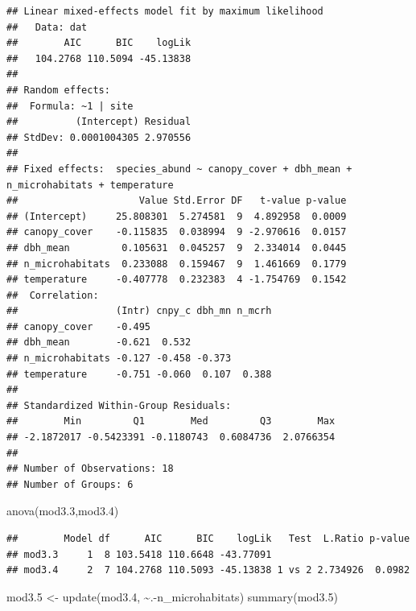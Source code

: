 \documentclass[
]{article}
\newenvironment{Shaded}{\begin{snugshade}}{\end{snugshade}}
\newcommand{\FloatTok}[1]{\textcolor[rgb]{0.00,0.00,0.81}{#1}}
\newcommand{\FunctionTok}[1]{\textcolor[rgb]{0.00,0.00,0.00}{#1}}
\newcommand{\NormalTok}[1]{#1}
\newcommand{\OtherTok}[1]{\textcolor[rgb]{0.56,0.35,0.01}{#1}}
\newcommand{\SpecialCharTok}[1]{\textcolor[rgb]{0.00,0.00,0.00}{#1}}
\begin{document}
\begin{verbatim}
## Linear mixed-effects model fit by maximum likelihood
##   Data: dat 
##        AIC      BIC    logLik
##   104.2768 110.5094 -45.13838
## 
## Random effects:
##  Formula: ~1 | site
##          (Intercept) Residual
## StdDev: 0.0001004305 2.970556
## 
## Fixed effects:  species_abund ~ canopy_cover + dbh_mean + n_microhabitats + temperature 
##                     Value Std.Error DF   t-value p-value
## (Intercept)     25.808301  5.274581  9  4.892958  0.0009
## canopy_cover    -0.115835  0.038994  9 -2.970616  0.0157
## dbh_mean         0.105631  0.045257  9  2.334014  0.0445
## n_microhabitats  0.233088  0.159467  9  1.461669  0.1779
## temperature     -0.407778  0.232383  4 -1.754769  0.1542
##  Correlation: 
##                 (Intr) cnpy_c dbh_mn n_mcrh
## canopy_cover    -0.495                     
## dbh_mean        -0.621  0.532              
## n_microhabitats -0.127 -0.458 -0.373       
## temperature     -0.751 -0.060  0.107  0.388
## 
## Standardized Within-Group Residuals:
##        Min         Q1        Med         Q3        Max 
## -2.1872017 -0.5423391 -0.1180743  0.6084736  2.0766354 
## 
## Number of Observations: 18
## Number of Groups: 6
\end{verbatim}

\begin{Shaded}
\begin{Highlighting}[]
\FunctionTok{anova}\NormalTok{(mod3}\FloatTok{.3}\NormalTok{,mod3}\FloatTok{.4}\NormalTok{)}
\end{Highlighting}
\end{Shaded}

\begin{verbatim}
##        Model df      AIC      BIC    logLik   Test  L.Ratio p-value
## mod3.3     1  8 103.5418 110.6648 -43.77091                        
## mod3.4     2  7 104.2768 110.5093 -45.13838 1 vs 2 2.734926  0.0982
\end{verbatim}

\begin{Shaded}
\begin{Highlighting}[]
\NormalTok{mod3}\FloatTok{.5} \OtherTok{\textless{}{-}} \FunctionTok{update}\NormalTok{(mod3}\FloatTok{.4}\NormalTok{, }\SpecialCharTok{\textasciitilde{}}\NormalTok{.}\SpecialCharTok{{-}}\NormalTok{n\_microhabitats)}
\FunctionTok{summary}\NormalTok{(mod3}\FloatTok{.5}\NormalTok{)}
\end{Highlighting}
\end{Shaded}
\end{document}
